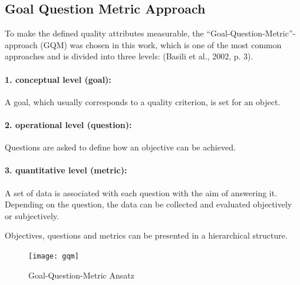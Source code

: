\subsection{Goal Question Metric Approach}
To make the defined quality attributes measurable, the “Goal-Question-Metric”-approach (GQM) was chosen in this work, which is one of the most common approaches and is divided into three levels: 
(Basili et al., 2002, p. 3).

\paragraph{1. conceptual level (goal):}
A goal, which usually corresponds to a quality criterion, is set for an object.
\paragraph{2. operational level (question):}
Questions are asked to define how an objective can be achieved.
\paragraph{3. quantitative level (metric):}
A set of data is associated with each question with the aim of answering it. Depending on the question, the data can be collected and evaluated objectively or subjectively.

Objectives, questions and metrics can be presented in a hierarchical structure.

\begin{figure}[ht!] %
	\centering
	\texttt{[image: gqm]}
	\caption[GQM tree stucture ]{Goal-Question-Metric Ansatz \cite[p. 3]{basili_goalquestionmetric_}} 
	\label{fig:gqm}
\end{figure}




